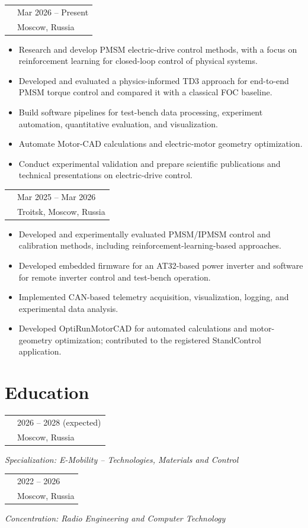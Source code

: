 \documentclass[10pt,a4paper]{article}
\makeatletter
\newcommand{\cvrole}[4]{%
  \begin{tabularx}{\textwidth}{@{}>{\raggedright\arraybackslash}X
    >{\raggedleft\arraybackslash}p{0.27\textwidth}@{}}
    {\sffamily\bfseries #1} & {\small\color{textgray}#4} \\
    {\itshape #2} & {\small\color{lightgray}#3}
  \end{tabularx}
  \vspace{0.12em}
}
\makeatother
\begin{document}
\cvrole{Moscow Institute of Physics and Technology}
       {Research Engineer, Robotics and Electric Drive Laboratory}
       {Moscow, Russia}{Mar 2026 -- Present}
\begin{itemize}
  \item Research and develop PMSM electric-drive control methods, with a focus
        on reinforcement learning for closed-loop control of physical systems.
  \item Developed and evaluated a physics-informed TD3 approach for end-to-end
        PMSM torque control and compared it with a classical FOC baseline.
  \item Build software pipelines for test-bench data processing, experiment
        automation, quantitative evaluation, and visualization.
  \item Automate Motor-CAD calculations and electric-motor geometry optimization.
  \item Conduct experimental validation and prepare scientific publications and
        technical presentations on electric-drive control.
\end{itemize}

\vspace{0.35em}
\cvrole{AmpereMagnete}
       {Engineering Intern, Artificial Intelligence Group}
       {Troitsk, Moscow, Russia}{Mar 2025 -- Mar 2026}
\begin{itemize}
  \item Developed and experimentally evaluated PMSM/IPMSM control and
        calibration methods, including reinforcement-learning-based approaches.
  \item Developed embedded firmware for an AT32-based power inverter and
        software for remote inverter control and test-bench operation.
  \item Implemented CAN-based telemetry acquisition, visualization, logging, and
        experimental data analysis.
  \item Developed OptiRunMotorCAD for automated calculations and motor-geometry
        optimization; contributed to the registered StandControl application.
\end{itemize}

\section{Education}

\cvrole{Moscow Institute of Physics and Technology}
       {M.Sc. in Applied Mathematics and Physics}
       {Moscow, Russia}{2026 -- 2028 (expected)}
{\small\textit{Specialization: E-Mobility -- Technologies, Materials and Control}}\par
\vspace{0.25em}
\cvrole{Moscow Institute of Physics and Technology}
       {B.Sc. in Applied Mathematics and Physics}
       {Moscow, Russia}{2022 -- 2026}
{\small\textit{Concentration: Radio Engineering and Computer Technology}}\par
\end{document}
